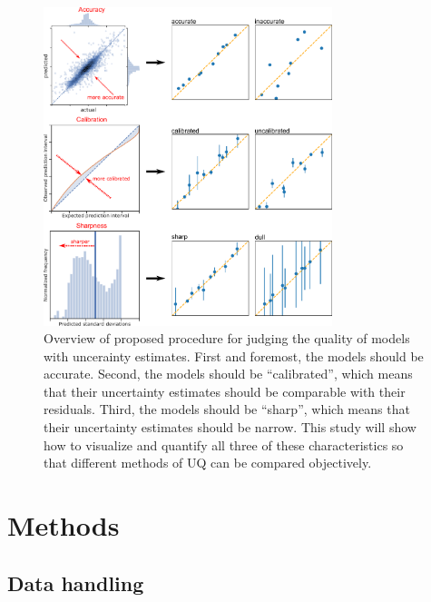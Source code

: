 \documentclass[]{achemso}
\begin{document}
\begin{figure}
    \centering
    \includegraphics[width=0.75\textwidth]{intro/intro.pdf}
    \caption{Overview of proposed procedure for judging the quality of models with uncerainty estimates.
    First and foremost, the models should be accurate.
    Second, the models should be ``calibrated'', which means that their uncertainty estimates should be comparable with their residuals.
    Third, the models should be ``sharp'', which means that their uncertainty estimates should be narrow.
    This study will show how to visualize and quantify all three of these characteristics so that different methods of \gls{UQ} can be compared objectively.}\label{fig:overview}
\end{figure}



\section{Methods}

\subsection{Data handling}
\end{document}
